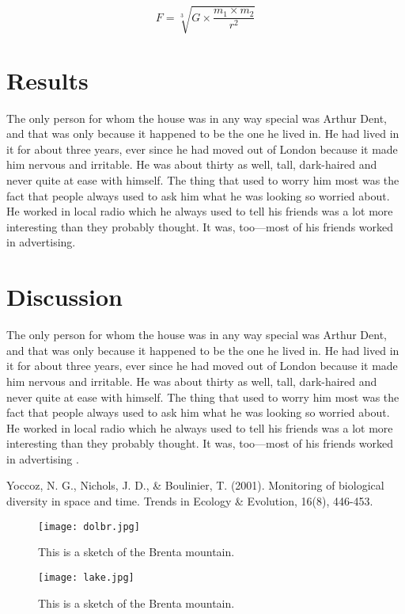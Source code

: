 \begin{equation}
    F = \sqrt[3]{G \times \frac{m_1 \times m_2}{r^2}}
    \label{eq:newton}
\end{equation}


\section{Results}

The only person for whom the house was in any way special was Arthur Dent, and that was only because it happened to be the one he lived in. He had lived in it for about three years, ever since he had moved out of London because it made him nervous and irritable. He was about thirty as well, tall, dark-haired and never quite at ease with himself. The thing that used to worry him most was the fact that people always used to ask him what he was looking so worried about. He worked in local radio which he always used to tell his friends was a lot more interesting than they probably thought. It was, too—most of his friends worked in advertising.


\section{Discussion}
The only person for whom the house was in any way special was Arthur Dent, and that was only because it happened to be the one he lived in. He had lived in it for about three years, ever since he had moved out of London because it made him nervous and irritable. He was about thirty as well, tall, dark-haired and never quite at ease with himself. The thing that used to worry him most was the fact that people always used to ask him what he was looking so worried about. He worked in local radio which he always used to tell his friends was a lot more interesting than they probably thought. It was, too—most of his friends worked in advertising \citep{yoccoz2001}.

\begin{thebibliography}{999}
    Yoccoz, N. G., Nichols, J. D., \& Boulinier, T. (2001). Monitoring of biological diversity in space and time. Trends in Ecology \& Evolution, 16(8), 446-453.
\end{thebibliography}

\begin{figure}
    \centering
    \texttt{[image: dolbr.jpg]}
    \caption{This is a sketch of the Brenta mountain.}
    \label{fig:brenta}
\end{figure}

\begin{figure}
    \centering
    \texttt{[image: lake.jpg]}
    \caption{This is a sketch of the Brenta mountain.}
    \label{fig:lake}
\end{figure}


